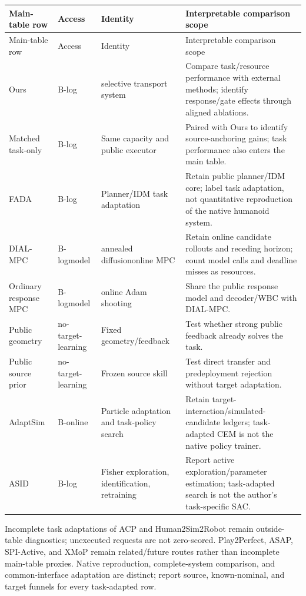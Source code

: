\begingroup\small
\begin{longtable}{L{3.2cm}L{2.2cm}L{2.7cm}L{4.5cm}}
\toprule
Main-table row & Access & Identity & Interpretable comparison scope\\\midrule\endfirsthead
\toprule Main-table row & Access & Identity & Interpretable comparison scope\\\midrule\endhead
Ours & B-log & selective transport system & Compare task/resource performance with external methods; identify response/gate effects through aligned ablations.\\
Matched task-only & B-log & Same capacity and public executor & Paired with Ours to identify source-anchoring gains; task performance also enters the main table.\\
FADA & B-log & Planner/IDM task adaptation & Retain public planner/IDM core; label task adaptation, not quantitative reproduction of the native humanoid system\cite{fada}.\\
DIAL-\newline MPC & B-log\newline model & annealed diffusion\newline online MPC & Retain online candidate rollouts and receding horizon; count model calls and deadline misses as resources\cite{dialmpc}.\\
Ordinary response MPC & B-log\newline model & online Adam shooting & Share the public response model and decoder/WBC with DIAL-MPC.\\
Public geometry & no-target-learning & Fixed geometry/feedback & Test whether strong public feedback already solves the task.\\
Public source prior & no-target-learning & Frozen source skill & Test direct transfer and predeployment rejection without target adaptation.\\
AdaptSim & B-online & Particle adaptation and task-policy search & Retain target-interaction/simulated-candidate ledgers; task-adapted CEM is not the native policy trainer\cite{adaptsim}.\\
ASID & B-log & Fisher exploration, identification, retraining & Report active exploration/parameter estimation; task-adapted search is not the author's task-specific SAC\cite{asid}.\\
\bottomrule
\end{longtable}
\endgroup

Incomplete task adaptations of ACP and Human2Sim2Robot remain outside-table diagnostics;
unexecuted requests are not zero-scored\cite{acp,human2sim}. Play2Perfect, ASAP,
SPI-Active, and XMoP remain related/future routes rather than incomplete main-table
proxies\cite{play2perfect,asap,spi,xmop}. Native reproduction, complete-system comparison,
and common-interface adaptation are distinct; report source, known-nominal, and target
funnels for every task-adapted row.

